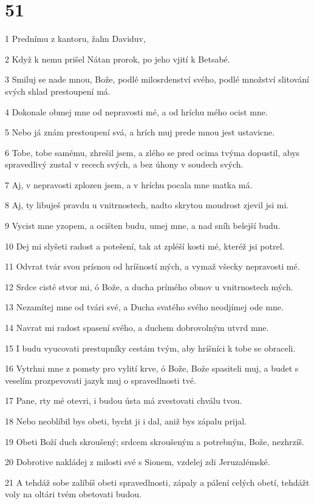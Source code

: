 \chapter{51}

\par 1 Prednímu z kantoru, žalm Daviduv,
\par 2 Když k nemu prišel Nátan prorok, po jeho vjití k Betsabé.
\par 3 Smiluj se nade mnou, Bože, podlé milosrdenství svého, podlé množství slitování svých shlad prestoupení má.
\par 4 Dokonale obmej mne od nepravosti mé, a od hríchu mého ocist mne.
\par 5 Nebo já znám prestoupení svá, a hrích muj prede mnou jest ustavicne.
\par 6 Tobe, tobe samému, zhrešil jsem, a zlého se pred ocima tvýma dopustil, abys spravedlivý zustal v recech svých, a bez úhony v soudech svých.
\par 7 Aj, v nepravosti zplozen jsem, a v hríchu pocala mne matka má.
\par 8 Aj, ty libuješ pravdu u vnitrnostech, nadto skrytou moudrost zjevil jsi mi.
\par 9 Vycist mne yzopem, a ocišten budu, umej mne, a nad sníh belejší budu.
\par 10 Dej mi slyšeti radost a potešení, tak at zpléší kosti mé, kteréž jsi potrel.
\par 11 Odvrat tvár svou prísnou od hríšností mých, a vymaž všecky nepravosti mé.
\par 12 Srdce cisté stvor mi, ó Bože, a ducha prímého obnov u vnitrnostech mých.
\par 13 Nezamítej mne od tvári své, a Ducha svatého svého neodjímej ode mne.
\par 14 Navrat mi radost spasení svého, a duchem dobrovolným utvrd mne.
\par 15 I budu vyucovati prestupníky cestám tvým, aby hríšníci k tobe se obraceli.
\par 16 Vytrhni mne z pomsty pro vylití krve, ó Bože, Bože spasiteli muj, a budet s veselím prozpevovati jazyk muj o spravedlnosti tvé.
\par 17 Pane, rty mé otevri, i budou ústa má zvestovati chválu tvou.
\par 18 Nebo neoblíbil bys obeti, bycht ji i dal, aniž bys zápalu prijal.
\par 19 Obeti Boží duch skroušený; srdcem skroušeným a potrebným, Bože, nezhrzíš.
\par 20 Dobrotive nakládej z milosti své s Sionem, vzdelej zdi Jeruzalémské.
\par 21 A tehdáž sobe zalíbíš obeti spravedlnosti, zápaly a pálení celých obetí, tehdážt voly na oltári tvém obetovati budou.

